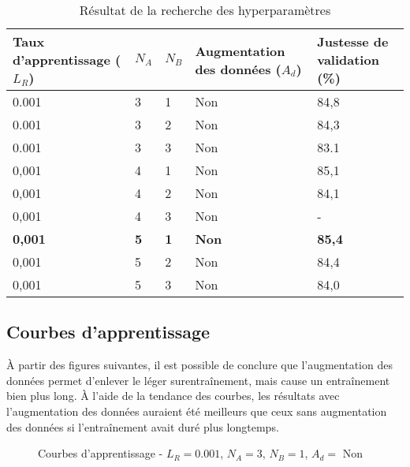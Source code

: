     \begin{longtable}{p{4cm}p{1cm}p{1cm}p{3.5cm}p{4cm}}
        \caption{Résultat de la recherche des hyperparamètres}\\
        \hline
        Taux d'apprentissage (\(L_R\)) & \(N_A\) & \(N_B\) & Augmentation des données (\(A_d\)) & Justesse de validation (\%) \\
        \hline\hline
        0.001 & 3 & 1 & Non & 84,8\\
        0.001 & 3 & 2 & Non & 84,3\\
        0.001 & 3 & 3 & Non & 83.1\\
        
        0,001 & 4 & 1 & Non & 85,1\\
        0,001 & 4 & 2 & Non & 84,1\\
        0,001 & 4 & 3 & Non & - \\
        
        \textbf{0,001} & \textbf{5} & \textbf{1} & \textbf{Non} & \textbf{85,4}\\
        0,001 & 5 & 2 & Non & 84,4\\
        0,001 & 5 & 3 & Non & 84,0\\
        
        \hline
    \end{longtable}

\subsection{Courbes d'apprentissage}
    À partir des figures suivantes, il est possible de conclure que l'augmentation des données permet d'enlever le léger surentraînement, mais cause un entraînement bien plus long. À l'aide de la tendance des courbes, les résultats avec l'augmentation des données auraient été meilleurs que ceux sans augmentation des données si l'entraînement avait duré plus longtemps.

    \begin{figure}[H]
        \centering 
        \caption{Courbes d’apprentissage - \(L_R=0.001\), \(N_A=3\), \(N_B=1\), \(A_d= \) Non}
    \end{figure}
